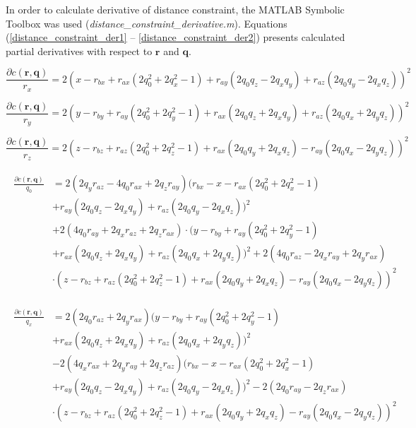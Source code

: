 In order to calculate derivative of distance constraint, the MATLAB Symbolic Toolbox was used \mbox{(\textit{distance\_constraint\_derivative.m})}. Equations (\ref{distance_constraint_der1} -- \ref{distance_constraint_der2}) presents calculated partial derivatives with respect to $\bm{r}$ and $\bm{q}$.

\begin{equation}
	\frac{\partial c(\bm{r}, \bm{q})}{r_x} = 2(x - r_{bx} + r_{ax}(2q_0^2 + 2q_x^2 - 1) + r_{ay}(2q_0q_z - 2q_xq_y) + r_{az}(2q_0q_y - 2q_xq_z))^2 
	\label{distance_constraint_der1}
\end{equation}

\begin{equation}
	\frac{\partial c(\bm{r}, \bm{q})}{r_y} = 2(y - r_{by} + r_{ay}(2q_0^2 + 2q_y^2 - 1) + r_{ax}(2q_0q_z + 2q_xq_y) + r_{az}(2q_0q_x + 2q_yq_z))^2
\end{equation}

\begin{equation}
	\frac{\partial c(\bm{r}, \bm{q})}{r_z} = 2(z - r_{bz} + r_{az}(2q_0^2 + 2q_z^2 - 1) + r_{ax}(2q_0q_y + 2q_xq_z) - r_{ay}(2q_0q_x - 2q_yq_z))^2
\end{equation}

\begin{align}
\begin{split}
	\frac{\partial c(\bm{r}, \bm{q})}{q_0} &= 2(2q_yr_{az} - 4q_0r_{ax} + 2q_zr_{ay})(r_{bx} - x - r_{ax}(2q_0^2 + 2q_x^2 - 1)\\
	&+ r_{ay}(2q_0q_z - 2q_xq_y) + r_{az}(2q_0q_y - 2q_xq_z))^2\\
	&+ 2(4q_0r_{ay} +  2q_xr_{az} + 2q_zr_{ax}) \cdot(y - r_{by} + r_{ay}(2q_0^2 + 2q_y^2 - 1)\\
	&+ r_{ax}(2q_0q_z + 2q_xq_y) + r_{az}(2q_0q_x + 2q_yq_z))^2 + 2(4q_0r_{az} - 2q_xr_{ay} + 2q_yr_{ax})\\
	&\cdot(z - r_{bz} + r_{az}(2q_0^2 + 2q_z^2 - 1) + r_{ax}(2q_0q_y + 2q_xq_z) - r_{ay}(2q_0q_x - 2q_yq_z))^2
\end{split}
\end{align}

\begin{align}
\begin{split}
	\frac{\partial c(\bm{r}, \bm{q})}{q_x} &= 2(2q_0r_{az} + 2q_yr_{ax})(y - r_{by} + r_{ay}(2q_0^2 + 2q_y^2 - 1)\\
	&+ r_{ax}(2q_0q_z + 2q_xq_y) + r_{az}(2q_0q_x + 2q_yq_z))^2\\
	&- 2(4q_xr_{ax} + 2q_yr_{ay} + 2q_zr_{az})(r_{bx} - x - r_{ax}(2q_0^2 + 2q_x^2 - 1)\\
	&+ r_{ay}(2q_0q_z - 2q_xq_y) + r_{az}(2q_0q_y - 2q_xq_z))^2 - 2(2q_0r_{ay} - 2q_zr_{ax})\\
	&\cdot(z - r_{bz} + r_{az}(2q_0^2 + 2q_z^2 - 1) + r_{ax}(2q_0q_y + 2q_xq_z) - r_{ay}(2q_0q_x - 2q_yq_z))^2
\end{split}
\end{align}

